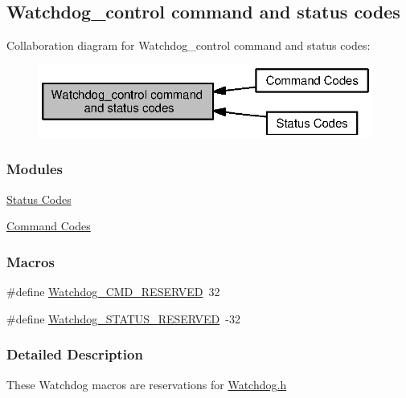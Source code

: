 \subsection{Watchdog\+\_\+control command and status codes}
\label{group___watchdog___c_o_n_t_r_o_l}
Collaboration diagram for Watchdog\+\_\+control command and status codes\+:
\nopagebreak
\begin{figure}[H]
\begin{center}
\leavevmode
\includegraphics[width=311pt]{group___watchdog___c_o_n_t_r_o_l}
\end{center}
\end{figure}
\subsubsection*{Modules}
\begin{DoxyCompactItemize}
\item 
\hyperlink{group___watchdog___s_t_a_t_u_s}{Status Codes}
\item 
\hyperlink{group___watchdog___c_m_d}{Command Codes}
\end{DoxyCompactItemize}
\subsubsection*{Macros}
\begin{DoxyCompactItemize}
\item 
\#define \hyperlink{group___watchdog___c_o_n_t_r_o_l_ga4d1b16e67bf555b8fe49182eb8a28b97}{Watchdog\+\_\+\+C\+M\+D\+\_\+\+R\+E\+S\+E\+R\+V\+E\+D}~32
\item 
\#define \hyperlink{group___watchdog___c_o_n_t_r_o_l_gaf7d1273929fd4d1f630c31b90def9684}{Watchdog\+\_\+\+S\+T\+A\+T\+U\+S\+\_\+\+R\+E\+S\+E\+R\+V\+E\+D}~-\/32
\end{DoxyCompactItemize}


\subsubsection{Detailed Description}
These Watchdog macros are reservations for \hyperlink{_watchdog_8h}{Watchdog.\+h} 

